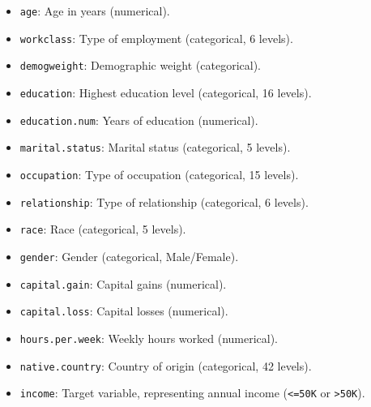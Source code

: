 \documentclass[
]{book}
\newcommand{\passthrough}[1]{#1}
\providecommand{\tightlist}{%
  \setlength{\itemsep}{0pt}\setlength{\parskip}{0pt}}
\theoremstyle{definition}
\theoremstyle{definition}
\theoremstyle{definition}
\theoremstyle{definition}
\theoremstyle{remark}
\begin{document}
\begin{itemize}
\tightlist
\item
  \passthrough{\lstinline!age!}: Age in years (numerical).\\
\item
  \passthrough{\lstinline!workclass!}: Type of employment (categorical, 6 levels).\\
\item
  \passthrough{\lstinline!demogweight!}: Demographic weight (categorical).\\
\item
  \passthrough{\lstinline!education!}: Highest education level (categorical, 16 levels).\\
\item
  \passthrough{\lstinline!education.num!}: Years of education (numerical).\\
\item
  \passthrough{\lstinline!marital.status!}: Marital status (categorical, 5 levels).\\
\item
  \passthrough{\lstinline!occupation!}: Type of occupation (categorical, 15 levels).\\
\item
  \passthrough{\lstinline!relationship!}: Type of relationship (categorical, 6 levels).\\
\item
  \passthrough{\lstinline!race!}: Race (categorical, 5 levels).\\
\item
  \passthrough{\lstinline!gender!}: Gender (categorical, Male/Female).\\
\item
  \passthrough{\lstinline!capital.gain!}: Capital gains (numerical).\\
\item
  \passthrough{\lstinline!capital.loss!}: Capital losses (numerical).\\
\item
  \passthrough{\lstinline!hours.per.week!}: Weekly hours worked (numerical).\\
\item
  \passthrough{\lstinline!native.country!}: Country of origin (categorical, 42 levels).\\
\item
  \passthrough{\lstinline!income!}: Target variable, representing annual income (\passthrough{\lstinline!<=50K!} or \passthrough{\lstinline!>50K!}).
\end{itemize}
\end{document}
